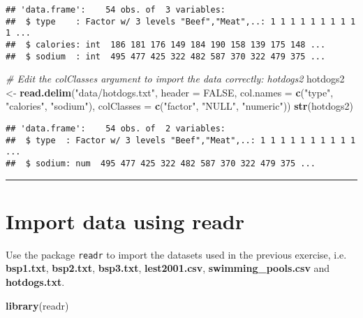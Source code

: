 \documentclass[]{article}
\newenvironment{Shaded}{\begin{snugshade}}{\end{snugshade}}
\newcommand{\KeywordTok}[1]{\textcolor[rgb]{0.13,0.29,0.53}{\textbf{#1}}}
\newcommand{\DataTypeTok}[1]{\textcolor[rgb]{0.13,0.29,0.53}{#1}}
\newcommand{\StringTok}[1]{\textcolor[rgb]{0.31,0.60,0.02}{#1}}
\newcommand{\CommentTok}[1]{\textcolor[rgb]{0.56,0.35,0.01}{\textit{#1}}}
\newcommand{\OtherTok}[1]{\textcolor[rgb]{0.56,0.35,0.01}{#1}}
\newcommand{\NormalTok}[1]{#1}
\begin{document}
\begin{verbatim}
## 'data.frame':    54 obs. of  3 variables:
##  $ type    : Factor w/ 3 levels "Beef","Meat",..: 1 1 1 1 1 1 1 1 1 1 ...
##  $ calories: int  186 181 176 149 184 190 158 139 175 148 ...
##  $ sodium  : int  495 477 425 322 482 587 370 322 479 375 ...
\end{verbatim}

\begin{Shaded}
\begin{Highlighting}[]
\CommentTok{# Edit the colClasses argument to import the data correctly: hotdogs2}
\NormalTok{hotdogs2 <-}\StringTok{ }\KeywordTok{read.delim}\NormalTok{(}\StringTok{"data/hotdogs.txt"}\NormalTok{, }\DataTypeTok{header =} \OtherTok{FALSE}\NormalTok{, }
                       \DataTypeTok{col.names =} \KeywordTok{c}\NormalTok{(}\StringTok{"type"}\NormalTok{, }\StringTok{"calories"}\NormalTok{, }\StringTok{"sodium"}\NormalTok{),}
                       \DataTypeTok{colClasses =} \KeywordTok{c}\NormalTok{(}\StringTok{"factor"}\NormalTok{, }\StringTok{"NULL"}\NormalTok{, }\StringTok{"numeric"}\NormalTok{))}
\KeywordTok{str}\NormalTok{(hotdogs2)}
\end{Highlighting}
\end{Shaded}

\begin{verbatim}
## 'data.frame':    54 obs. of  2 variables:
##  $ type  : Factor w/ 3 levels "Beef","Meat",..: 1 1 1 1 1 1 1 1 1 1 ...
##  $ sodium: num  495 477 425 322 482 587 370 322 479 375 ...
\end{verbatim}

\begin{center}\rule{0.5\linewidth}{\linethickness}\end{center}

\section{Import data using readr}\label{import-data-using-readr}

Use the package \texttt{readr} to import the datasets used in the
previous exercise, i.e. \textbf{bsp1.txt}, \textbf{bsp2.txt},
\textbf{bsp3.txt}, \textbf{lest2001.csv}, \textbf{swimming\_pools.csv}
and \textbf{hotdogs.txt}.

\begin{Shaded}
\begin{Highlighting}[]
\KeywordTok{library}\NormalTok{(readr)}
\end{Highlighting}
\end{Shaded}
\end{document}
